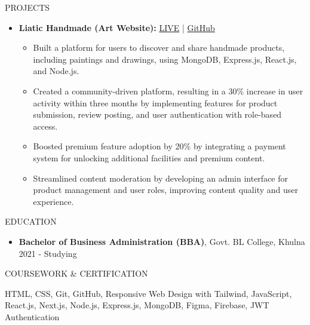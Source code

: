 \documentclass{resume} %
\begin{document}
\begin{rSection}{PROJECTS}
\begin{itemize}
    \item \textbf{Liatic Handmade (Art Website):} \hfill {\href{https://spontaneous-cassata-2832b3.netlify.app}{LIVE} | \href{https://github.com/jaynabKhatun/handmade-craft-store-client-side}{GitHub}}
    \begin{itemize}
        \item Built a platform for users to discover and share handmade products, including paintings and drawings, using MongoDB, Express.js, React.js, and Node.js.
        \item Created a community-driven platform, resulting in a 30\% increase in user activity within three months by implementing features for product submission, review posting, and user authentication with role-based access.
        \item Boosted premium feature adoption by 20\% by integrating a payment system for unlocking additional facilities and premium content.
        \item Streamlined content moderation by developing an admin interface for product management and user roles, improving content quality and user experience.
    \end{itemize}

\end{itemize}

\end{rSection} 


\begin{rSection}{EDUCATION}

\begin{itemize}
    \item {\bf Bachelor of Business Administration (BBA)}, Govt. BL College, Khulna \hfill {2021 - Studying}
\end{itemize}

\end{rSection}


\begin{rSection}{COURSEWORK \& CERTIFICATION}

{HTML, CSS, Git, GitHub, Responsive Web Design with Tailwind, JavaScript, React.js, Next.js, Node.js, Express.js, MongoDB, Figma, Firebase, JWT Authentication}

\end{rSection}
\end{document}
